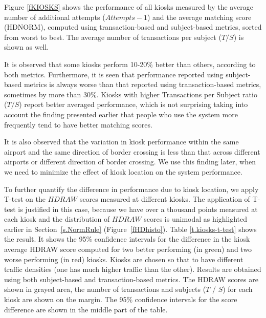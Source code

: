 \documentclass{cta-author}%
\begin{document}
Figure  \ref{fKIOSKS} 
shows the performance of all kiosks measured by the average number of additional attempts ($Attempts-1$) and the average matching score (HDNORM), computed using transaction-based and subject-based metrics, sorted from worst to best. The average number of transactions per subject ($T/S$) is shown as well.




It is  observed that 
some kiosks perform 10-20\% better than others, according to both 
metrics. 
Furthermore, it is seen that  performance reported using subject-based metrics is always worse than that reported using transaction-based metrics, sometimes by more than 30\%. 
Kiosks with higher Transactions per Subject ratio ($T/S$) report better averaged performance, 
which is not surprising taking into account the finding presented earlier that people who use the system more frequently tend to have better matching scores.


It is also observed that the variation in kiosk performance within the same airport and the same direction of border crossing  is less than that across different airports or different direction of border crossing. We use this finding later, when we need to minimize the effect of kiosk location on the system performance.

    
To  further quantify the difference in performance due to kiosk location, we apply T-test \cite{R-book} on the $HDRAW$ scores measured at different kiosks. The application of T-test is justified in this case, because we have over a thousand points measured at  each kiosk and the distribution of $HDRAW$ scores is unimodal as highlighted earlier in Section~\ref{s.NormRule} (Figure~\ref{fHDhisto}).
Table \ref{t.kiosks-t-test} shows the result. 
It shows 
the 95\% confidence intervals for the difference  in the kiosk average HDRAW score 
computed for 
two better performing (in green) and two worse performing (in red) kiosks. Kiosks are chosen so that to have different traffic densities (one has much higher traffic than the other). 
Results are obtained 
using both subject-based and transaction-based  metrics.
The HDRAW scores are shown in grayed area, the number of  transactions  and  subjects ($T$ / $S$) for each kiosk are shown on the margin. %
The  95\% confidence intervals for the score difference are shown in the middle part of  the table. 
\end{document}
